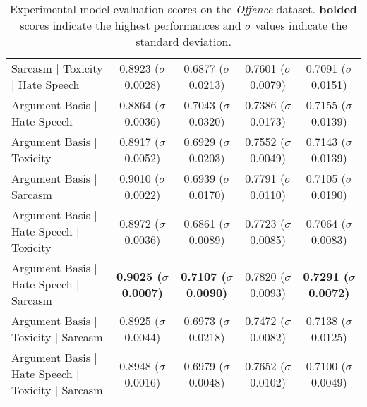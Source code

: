 \begin{table}[]
{\begin{tabular}{l|cccc}
    Sarcasm | Toxicity | Hate Speech                       & 0.8923 ($\sigma$ 0.0028)          & 0.6877 ($\sigma$ 0.0213)          & 0.7601 ($\sigma$ 0.0079)          & 0.7091 ($\sigma$ 0.0151)          \\
    Argument Basis | Hate Speech                           & 0.8864 ($\sigma$ 0.0036)          & 0.7043 ($\sigma$ 0.0320)          & 0.7386 ($\sigma$ 0.0173)          & 0.7155 ($\sigma$ 0.0139)          \\
    Argument Basis | Toxicity                              & 0.8917 ($\sigma$ 0.0052)          & 0.6929 ($\sigma$ 0.0203)          & 0.7552 ($\sigma$ 0.0049)          & 0.7143 ($\sigma$ 0.0139)          \\
    Argument Basis | Sarcasm                               & 0.9010 ($\sigma$ 0.0022)          & 0.6939 ($\sigma$ 0.0170)          & 0.7791 ($\sigma$ 0.0110)          & 0.7105 ($\sigma$ 0.0190)          \\
    Argument Basis | Hate Speech | Toxicity                & 0.8972 ($\sigma$ 0.0036)          & 0.6861 ($\sigma$ 0.0089)          & 0.7723 ($\sigma$ 0.0085)          & 0.7064 ($\sigma$ 0.0083)          \\
    Argument Basis | Hate Speech | Sarcasm                 & \textbf{0.9025 ($\sigma$ 0.0007)} & \textbf{0.7107 ($\sigma$ 0.0090)} & 0.7820 ($\sigma$ 0.0093)          & \textbf{0.7291 ($\sigma$ 0.0072)} \\
    Argument Basis | Toxicity | Sarcasm                    & 0.8925 ($\sigma$ 0.0044)          & 0.6973 ($\sigma$ 0.0218)          & 0.7472 ($\sigma$ 0.0082)          & 0.7138 ($\sigma$ 0.0125)          \\
    Argument Basis | Hate Speech | Toxicity | Sarcasm      & 0.8948 ($\sigma$ 0.0016)          & 0.6979 ($\sigma$ 0.0048)          & 0.7652 ($\sigma$ 0.0102)          & 0.7100 ($\sigma$ 0.0049)
  \end{tabular}%
  }
  \caption{Experimental model evaluation scores on the \textit{Offence} dataset. \textbf{bolded} scores indicate the highest performances and $\sigma$ values indicate the standard deviation.}
  \label{tab:mtl_test_davidson}
\end{table}

